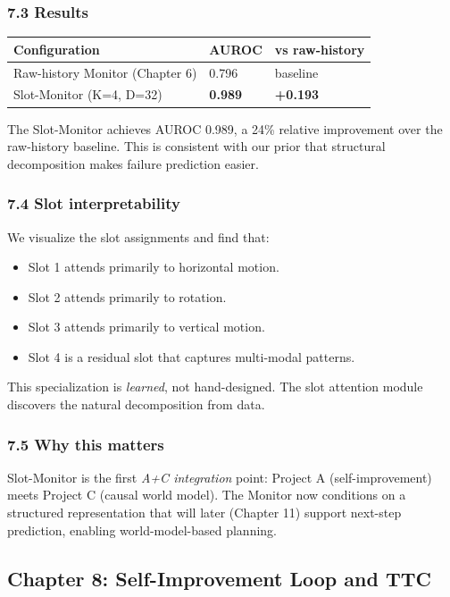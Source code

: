 \documentclass[11pt]{article}
\begin{document}
\subsubsection{7.3 Results}

\begin{tabular}{lll}
Configuration & AUROC & vs raw-history \\
\hline
Raw-history Monitor (Chapter 6) & 0.796 & baseline \\
Slot-Monitor (K=4, D=32) & \textbf{0.989} & \textbf{+0.193} \\
\end{tabular}


The Slot-Monitor achieves AUROC 0.989, a 24\% relative improvement over the
raw-history baseline. This is consistent with our prior that structural
decomposition makes failure prediction easier.

\subsubsection{7.4 Slot interpretability}

We visualize the slot assignments and find that:

\begin{itemize}
  \item Slot 1 attends primarily to horizontal motion.
  \item Slot 2 attends primarily to rotation.
  \item Slot 3 attends primarily to vertical motion.
  \item Slot 4 is a residual slot that captures multi-modal patterns.
\end{itemize}


This specialization is \textit{learned}, not hand-designed. The slot attention module
discovers the natural decomposition from data.

\subsubsection{7.5 Why this matters}

Slot-Monitor is the first \textit{A+C integration} point: Project A (self-improvement)
meets Project C (causal world model). The Monitor now conditions on a structured
representation that will later (Chapter 11) support next-step prediction,
enabling world-model-based planning.

\hrulefill

\subsection{Chapter 8: Self-Improvement Loop and TTC}
\end{document}
